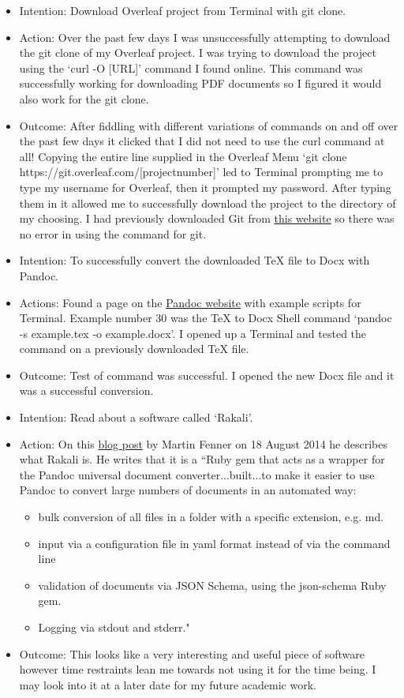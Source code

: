 \documentclass{article}
\begin{document}
\begin{itemize}
    \item Intention: Download Overleaf project from Terminal with git clone.
    \item Action: Over the past few days I was unsuccessfully attempting to download the git clone of my Overleaf project. I was trying to download the project using the `curl -O [URL]' command I found online. This command was successfully working for downloading PDF documents so I figured it would also work for the git clone.
    \item Outcome: After fiddling with different variations of commands on and off over the past few days it clicked that I did not need to use the curl command at all! Copying the entire line supplied in the Overleaf Menu `git clone https://git.overleaf.com/[projectnumber]' led to Terminal prompting me to type my username for Overleaf, then it prompted my password. After typing them in it allowed me to successfully download the project to the directory of my choosing. I had previously downloaded Git from \href{https://git-scm.com/downloads}{this website} so there was no error in using the command for git.
    \item Intention: To successfully convert the downloaded TeX file to Docx with Pandoc.
    \item Actions: Found a page on the \href{https://pandoc.org/demos.html}{Pandoc website} with example scripts for Terminal. Example number 30 was the TeX to Docx Shell command `pandoc -s example.tex -o example.docx'. I opened up a Terminal and tested the command on a previously downloaded TeX file.
    \item Outcome: Test of command was successful. I opened the new Docx file and it was a successful conversion.
    \item Intention: Read about a software called `Rakali'.
    \item Action: On this \href{https://blog.martinfenner.org/2014/08/18/introducing-rakali/}{blog post} by Martin Fenner on 18 August 2014 he describes what Rakali is. He writes that it is a ``Ruby gem that acts as a wrapper for the Pandoc universal document converter...built...to make it easier to use Pandoc to convert large numbers of documents in an automated way:
    \begin{itemize}
        \item bulk conversion of all files in a folder with a specific extension, e.g. md.
        \item input via a configuration file in yaml format instead of via the command line
        \item validation of documents via JSON Schema, using the json-schema Ruby gem.
        \item Logging via stdout and stderr."
    \end{itemize}
    \item Outcome: This looks like a very interesting and useful piece of software however time restraints lean me towards not using it for the time being. I may look into it at a later date for my future academic work.
\end{itemize}
\end{document}
